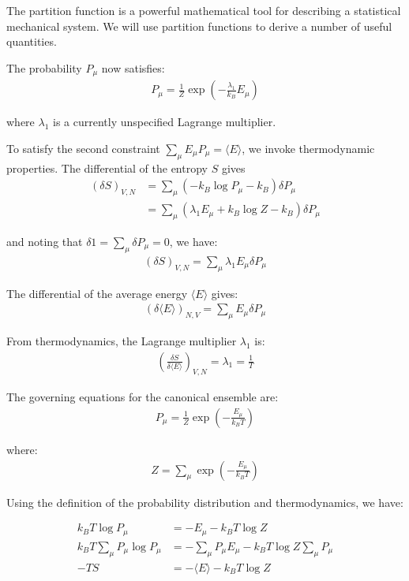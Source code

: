 \documentclass[book.tex]{subfiles}
\begin{document}
The partition function is a powerful mathematical tool for describing a statistical mechanical system. We will use partition functions to derive a number of useful quantities.

The probability $P_\mu$ now satisfies:
\begin{align}
P_\mu=\frac{1}{Z} \exp\left(-\frac{\lambda_1}{k_B}E_\mu \right) 
\end{align}

where $\lambda_1$ is a currently unspecified Lagrange multiplier.

To satisfy the second constraint $\sum_\mu E_\mu P_\mu = \langle E\rangle$, we invoke thermodynamic properties. The differential of the entropy $S$ gives
\begin{align}
\left(\delta S\right)_{V,N} &= \sum_\mu \left( - k_B \log P_\mu - k_B\right)\delta P_\mu \\ &= \sum_\mu \left(\lambda_1 E_\mu + k_B \log Z - k_B\right)\delta P_\mu
\end{align}

\noindent and noting that $\delta 1 = \sum_\mu \delta P_\mu = 0$, we have:
\begin{align}
\left(\delta S\right)_{V,N}  = \sum_\mu \lambda_1 E_\mu \delta P_\mu 
\end{align}

The differential of the average energy $\langle E \rangle$ gives: \begin{align}
\left(\delta \langle E \rangle \right)_{N,V} = \sum_\mu E_\mu \delta P_\mu 
\end{align}

From thermodynamics, the Lagrange multiplier $\lambda_1$ is:
\begin{align}
\left( \frac{\delta S}{\delta \langle E \rangle} \right)_{V,N} = \lambda_1 = \frac{1}{T}
\end{align}

The governing equations for the canonical ensemble are:
\begin{align}\label{ProbCanonical}
P_\mu = \frac{1}{Z}\exp\left(-\frac{E_\mu}{k_BT}\right)
\end{align}

\noindent where:
\begin{align}\label{PartCanonical}
Z = \sum_\mu \exp\left(-\frac{E_\mu}{k_BT}\right)
\end{align}

Using the definition of the probability distribution and thermodynamics, we have:

\begin{align}
k_BT \log P_\mu &= -E_\mu - k_BT \log Z \\
k_BT \sum_\mu P_\mu \log P_\mu &= -\sum_\mu P_\mu E_\mu - k_BT \log Z \sum_\mu P_\mu \\
-TS &=-\langle E \rangle - k_B T \log Z 
\end{align}
\end{document}
